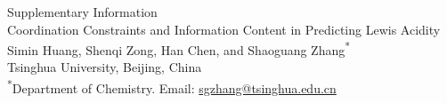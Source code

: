 \documentclass[10pt,a4paper]{article}
\begin{document}
\begin{center}
{\LARGE Supplementary Information}\\[8pt]
{\large Coordination Constraints and Information Content in Predicting Lewis Acidity}\\[6pt]
Simin Huang, Shenqi Zong, Han Chen, and Shaoguang Zhang\textsuperscript{*}\\
Tsinghua University, Beijing, China\\
{\small \textsuperscript{*}Department of Chemistry. Email: \href{mailto:sgzhang@tsinghua.edu.cn}{sgzhang@tsinghua.edu.cn}}
\end{center}

\end{document}
